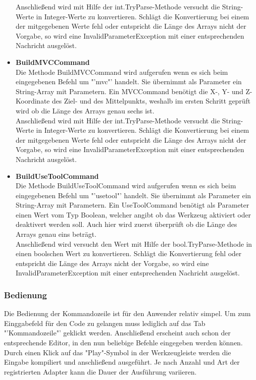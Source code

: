 \begin{itemize}
Anschließend wird mit Hilfe der int.TryParse-Methode versucht die String-Werte in Integer-Werte zu konvertieren. Schlägt die Konvertierung bei einem der mitgegebenen Werte fehl oder entspricht die Länge des Arrays nicht der Vorgabe, so wird eine InvalidParameterException mit einer entsprechenden Nachricht ausgelöst.
\item \textbf{BuildMVCCommand}\\
Die Methode BuildMVCCommand wird aufgerufen wenn es sich beim eingegebenen Befehl um "'mvc"' handelt. Sie übernimmt als Parameter ein String-Array mit Parametern. Ein MVCCommand benötigt die X-, Y- und Z-Koordinate des Ziel- und des Mittelpunkts, weshalb im ersten Schritt geprüft wird ob die Länge des Arrays genau sechs ist. \\
Anschließend wird mit Hilfe der int.TryParse-Methode versucht die String-Werte in Integer-Werte zu konvertieren. Schlägt die Konvertierung bei einem der mitgegebenen Werte fehl oder entspricht die Länge des Arrays nicht der Vorgabe, so wird eine InvalidParameterException mit einer entsprechenden Nachricht ausgelöst.
\item \textbf{BuildUseToolCommand}\\
Die Methode BuildUseToolCommand wird aufgerufen wenn es sich beim eingegebenen Befehl um "'usetool"' handelt. Sie übernimmt als Parameter ein String-Array mit Parametern. Ein UseToolCommand benötigt als Parameter einen Wert vom Typ Boolean, welcher angibt ob das Werkzeug aktiviert oder deaktivert werden soll. Auch hier wird zuerst überprüft ob die Länge des Arrays genau eins beträgt.\\
Anschließend wird versucht den Wert mit Hilfe der bool.TryParse-Methode in einen boolschen Wert zu konvertieren. Schlägt die Konvertierung fehl oder entspricht die Länge des Arrays nicht der Vorgabe, so wird eine InvalidParameterException mit einer entsprechenden Nachricht ausgelöst.
\end{itemize}

\subsubsection{Bedienung}
Die Bedienung der Kommandozeile ist für den Anwender relativ simpel. Um zum Einggabefeld für den Code zu gelangen muss lediglich auf das Tab "'Kommandozeile"' geklickt werden. Anschließend erscheint auch schon der entsprechende Editor, in den nun beliebige Befehle eingegeben werden können. Durch einen Klick auf das "Play"-Symbol in der Werkzeugleiste werden die Eingabe kompiliert und anschließend ausgeführt. Je nach Anzahl und Art der registrierten Adapter kann die Dauer der Ausführung variieren.
